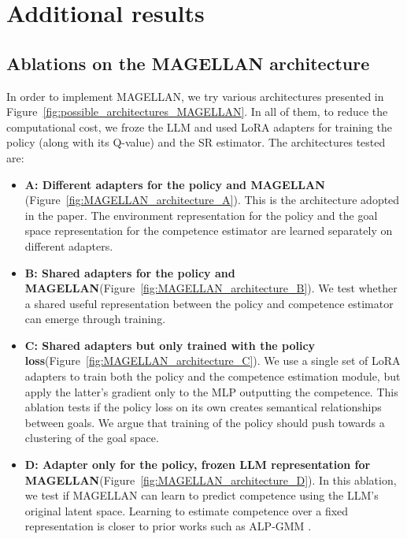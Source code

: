 \newpage
\section{Additional results} \label{app:additional_results}

\subsection{Ablations on the MAGELLAN architecture} \label{app:additional_results_magellan_architecture}

In order to implement MAGELLAN, we try various architectures presented in Figure~\ref{fig:possible_architectures_MAGELLAN}. In all of them, to reduce the computational cost, we froze the LLM and used LoRA adapters \cite{Hu2021LoRALA} for training the policy (along with its Q-value) and the SR estimator. The architectures tested are:
\begin{itemize}
    \item \textbf{A: Different adapters for the policy and MAGELLAN} (Figure~\ref{fig:MAGELLAN_architecture_A}). This is the architecture adopted in the paper. The environment representation for the policy and the goal space representation for the competence estimator are learned separately on different adapters.
    \item \textbf{B: Shared adapters for the policy and MAGELLAN}(Figure~\ref{fig:MAGELLAN_architecture_B}). We test whether a shared useful representation between the policy and competence estimator can emerge through training.
    \item \textbf{C: Shared adapters but only trained with the policy loss}(Figure~\ref{fig:MAGELLAN_architecture_C}). We use a single set of LoRA adapters to train both the policy and the competence estimation module, but apply the latter's gradient only to the MLP outputting the competence. This ablation tests if the policy loss on its own creates semantical relationships between goals. We argue that training of the policy should push towards a clustering of the goal space.
    \item \textbf{D: Adapter only for the policy, frozen LLM representation for MAGELLAN}(Figure~\ref{fig:MAGELLAN_architecture_D}). In this ablation, we test if MAGELLAN can learn to predict competence using the LLM's original latent space. Learning to estimate competence over a fixed representation is closer to prior works such as ALP-GMM \cite{portelas_teacher_2019}.   
     
\end{itemize}

